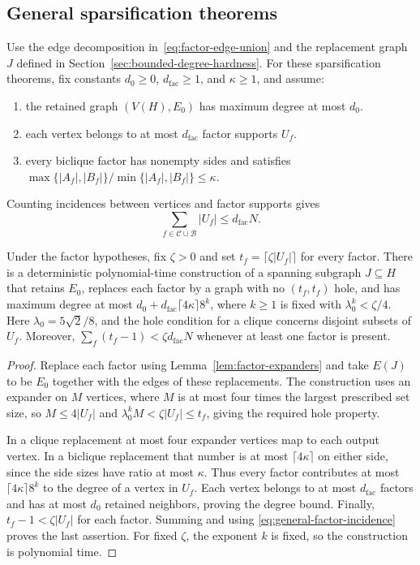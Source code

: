 \subsection{General sparsification theorems}
\label{subsec:general-sparsification}

Use the edge decomposition in~\eqref{eq:factor-edge-union} and the replacement graph $J$ defined in Section~\ref{sec:bounded-degree-hardness}.
For these sparsification theorems, fix constants $d_0\ge0$,
$d_{\mathrm{fac}}\ge1$, and $\kappa\ge1$, and assume:
\begin{enumerate}
\item the retained graph $(V(H),E_0)$ has maximum degree at most $d_0$.
\item each vertex belongs to at most $d_{\mathrm{fac}}$ factor supports $U_f$.
\item every biclique factor has nonempty sides and satisfies
$\max\{|A_f|,|B_f|\}/\min\{|A_f|,|B_f|\}\le\kappa$.
\end{enumerate}
Counting incidences between vertices and factor supports gives
\begin{equation}\label{eq:general-factor-incidence}
 \sum_{f\in\mathcal C\cup\mathcal B}|U_f|\le d_{\mathrm{fac}}N.
\end{equation}

\begin{lemma}
\label{lem:factor-replacement}
Under the factor hypotheses, fix $\zeta>0$ and set
$t_f=\lceil\zeta|U_f|\rceil$ for every factor. There is a
deterministic polynomial-time construction of a spanning subgraph
$J\subseteq H$ that retains $E_0$, replaces each factor by a graph
with no $(t_f,t_f)$ hole, and has maximum degree at most
$d_0+d_{\mathrm{fac}}\lceil4\kappa\rceil8^k$, where $k\ge1$ is fixed with
$\lambda_0^k<\zeta/4$. Here $\lambda_0=5\sqrt2/8$, and the hole condition
for a clique concerns disjoint subsets of $U_f$.
Moreover, $\sum_f(t_f-1)<\zeta d_{\mathrm{fac}}N$ whenever at least one factor
is present.
\end{lemma}

\begin{proof}
Replace each factor using Lemma~\ref{lem:factor-expanders} and
take $E(J)$ to be $E_0$ together with the edges of these
replacements. The construction uses an expander on $M$ vertices,
where $M$ is at most four times the largest prescribed set size, so
$M\le4|U_f|$ and $\lambda_0^kM<\zeta|U_f|\le t_f$,
giving the required hole property.

In a clique replacement at most four expander vertices map
to each output vertex. In a biclique replacement that number is
at most $\lceil4\kappa\rceil$ on either side, since the side
sizes have ratio at most $\kappa$. Thus every factor contributes
at most $\lceil4\kappa\rceil8^k$ to the degree of a vertex
in $U_f$. Each vertex belongs to at most $d_{\mathrm{fac}}$ factors and
has at most $d_0$ retained neighbors, proving the degree bound.
Finally, $t_f-1<\zeta|U_f|$ for each factor. Summing and using
\eqref{eq:general-factor-incidence} proves the last assertion.
For fixed $\zeta$, the exponent $k$ is fixed, so the construction
is polynomial time.
\end{proof}

